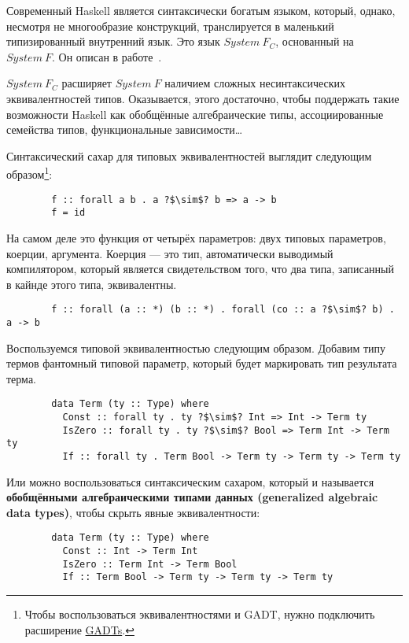 \documentclass[12pt]{article}
\newcommand{\vocab}[1]{\textbf{#1}} %
\begin{document}
    Современный Haskell является синтаксически богатым языком, который, однако, несмотря не многообразие конструкций, транслируется в маленький типизированный внутренний язык.
    Это язык $System~F_C$, основанный на $System~F$.
    Он описан в работе~\cite{sulzmann2007system}.

    $System~F_C$ расширяет $System~F$ наличием сложных несинтаксических эквивалентностей типов.
    Оказывается, этого достаточно, чтобы поддержать такие возможности Haskell как обобщённые алгебраические типы, ассоциированные семейства типов, функциональные зависимости\ldots

    Синтаксический сахар для типовых эквивалентностей выглядит следующим образом\footnote{Чтобы воспользоваться эквивалентностями и GADT, нужно подключить расширение \href{https://downloads.haskell.org/~ghc/9.0.1/docs/html/users_guide/exts/gadt.html}{GADTs}.}:
    \begin{verbatim}
        f :: forall a b . a ?$\sim$? b => a -> b
        f = id
    \end{verbatim}
    На самом деле это функция от четырёх параметров: двух типовых параметров, коерции, аргумента.
    Коерция --- это тип, автоматически выводимый компилятором, который является свидетельством того, что два типа, записанный в кайнде этого типа, эквивалентны.
    \begin{verbatim}
        f :: forall (a :: *) (b :: *) . forall (co :: a ?$\sim$? b) . a -> b
    \end{verbatim}

    Воспользуемся типовой эквивалентностью следующим образом.
    Добавим типу термов фантомный типовой параметр, который будет маркировать тип результата терма.
    \begin{verbatim}
        data Term (ty :: Type) where
          Const :: forall ty . ty ?$\sim$? Int => Int -> Term ty
          IsZero :: forall ty . ty ?$\sim$? Bool => Term Int -> Term ty
          If :: forall ty . Term Bool -> Term ty -> Term ty -> Term ty
    \end{verbatim}
    Или можно воспользоваться синтаксическим сахаром, который и называется \vocab{обобщёнными алгебраическими типами данных (generalized algebraic data types)}, чтобы скрыть явные эквивалентности:
    \begin{verbatim}
        data Term (ty :: Type) where
          Const :: Int -> Term Int
          IsZero :: Term Int -> Term Bool
          If :: Term Bool -> Term ty -> Term ty -> Term ty
    \end{verbatim}
\end{document}
